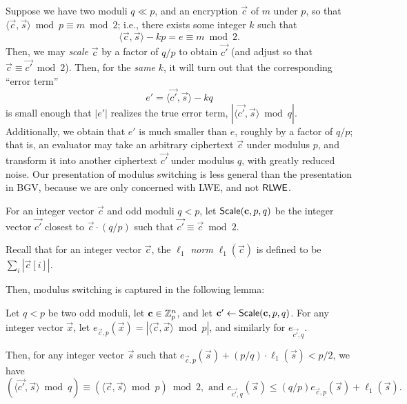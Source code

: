     Suppose we have two moduli $q \ll p$, and an encryption $\vec{c}$ of $m$ under $p$, so that $\langle \vec{c}, \vec{s} \rangle \bmod p \equiv m \bmod 2$; i.e., there exists some integer $k$ such that
    \[\langle \vec{c}, \vec{s} \rangle - kp = e \equiv m \bmod 2.\]
    Then, we may \emph{scale} $\vec{c}$ by a factor of $q / p$ to obtain $\vec{c'}$ (and adjust so that $\vec{c} \equiv \vec{c'} \bmod 2$). Then, for the \emph{same} $k$, it will turn out that the corresponding ``error term''
    \[e' = \langle \vec{c'}, \vec{s} \rangle - kq\]
    is small enough that $|e'|$ realizes the true error term, $\left| \langle \vec{c'}, \vec{s} \rangle \bmod q\right|$. Additionally, we obtain that $e'$ is much smaller than $e$, roughly by a factor of $q / p$; that is, an evaluator may take an arbitrary ciphertext $\vec{c}$ under modulus $p$, and transform it into another ciphertext $\vec{c'}$ under modulus $q$, with greatly reduced noise. Our presentation of modulus switching is less general than the presentation in BGV, because we are only concerned with LWE, and not ${\sf RLWE}$.

    \begin{definition}
        For an integer vector $\vec{c}$ and odd moduli $q < p$, let ${\sf Scale}(\vec{c}, p, q)$ be the integer vector $\vec{c'}$ closest to $\vec{c} \cdot (q / p)$ such that $\vec{c'} \equiv \vec{c} \bmod 2$.
    \end{definition}

    Recall that for an integer vector $\vec{c}$, the \emph{$\ell_1$ norm} $\ell_1(\vec{c})$ is defined to be $\sum_i |\vec{c}[i]|$.

    Then, modulus switching is captured in the following lemma:

    \begin{lemma} \label{lem:modulusswitch}
        Let $q < p$ be two odd moduli, let $\vec{c} \in \Z_p^n$, and let $\vec{c'} \leftarrow {\sf Scale}(\vec{c}, p, q)$. For any integer vector $\vec{x}$, let $e_{\vec{c}, p}(\vec{x}) = |\langle \vec{c}, \vec{x} \rangle \bmod p|$, and similarly for $e_{\vec{c'}, q}$.

        Then, for any integer vector $\vec{s}$ such that $e_{\vec{c}, p}(\vec{s}) + (p / q) \cdot \ell_1(\vec{s}) < p/2$, we have
        \[
            (\langle \vec{c'}, \vec{s} \rangle \bmod q) \equiv (\langle \vec{c}, \vec{s} \rangle \bmod p) \bmod 2, \text{ and } e_{\vec{c'}, q}(\vec{s}) \leq (q / p) e_{\vec{c}, p}(\vec{s}) + \ell_1(\vec{s}).
        \]
    \end{lemma}

